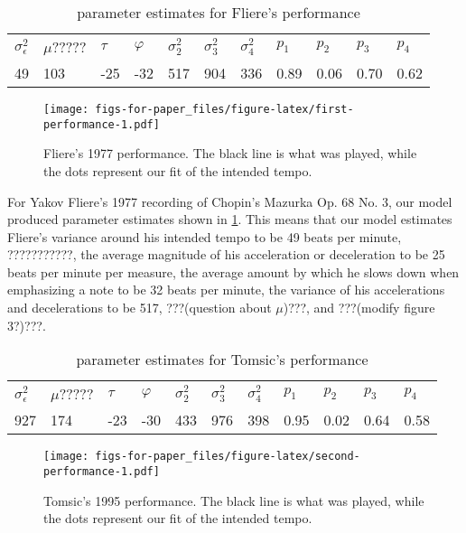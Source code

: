 \documentclass[12pt]{article}
\begin{document}
\begin{table}[]
\begin{tabular}{lllllllllll}
$\sigma_\epsilon^2$ & $\mu$????? & $\tau$ & $\varphi$ & $\sigma_2^2$ & $\sigma_3^2$ & $\sigma_4^2$ & $p_1$ & $p_2$ & $p_3$ & $p_4$ \\
49 & 103 & -25 & -32 & 517 & 904 & 336 & 0.89 & 0.06 & 0.70 & 0.62\\
\end{tabular}
\caption{parameter estimates for Fliere's performance}
\label{table:fliere}
\end{table}

\begin{figure}
    \texttt{[image: figs-for-paper\_files/figure-latex/first-performance-1.pdf]}
    \caption{Fliere's 1977 performance. The black line is what was played, while the dots represent our fit of the intended tempo.}
    \label{figure:fliere}
\end{figure}

For Yakov Fliere's 1977 recording of Chopin's Mazurka Op. 68 No. 3, our model produced parameter estimates shown in \ref{table:fliere}. This means that our model estimates Fliere's variance around his intended tempo to be 49 beats per minute, ???????????, the average magnitude of his acceleration or deceleration to be 25 beats per minute per measure, the average amount by which he slows down when emphasizing a note to be 32 beats per minute, the variance of his accelerations and decelerations to be 517, ???(question about $\mu$)???, and ???(modify figure 3?)???.

\begin{table}[]
\begin{tabular}{lllllllllll}
$\sigma_\epsilon^2$ & $\mu$????? & $\tau$ & $\varphi$ & $\sigma_2^2$ & $\sigma_3^2$ & $\sigma_4^2$ & $p_1$ & $p_2$ & $p_3$ & $p_4$ \\
927 & 174 & -23 & -30 & 433 & 976 & 398 & 0.95 & 0.02 & 0.64 & 0.58\\
\end{tabular}
\caption{parameter estimates for Tomsic's performance}
\label{table:tomsic}
\end{table}

\begin{figure}
    \texttt{[image: figs-for-paper\_files/figure-latex/second-performance-1.pdf]}
    \caption{Tomsic's 1995 performance. The black line is what was played, while the dots represent our fit of the intended tempo.}
    \label{figure:tomsic}
\end{figure}
\end{document}
